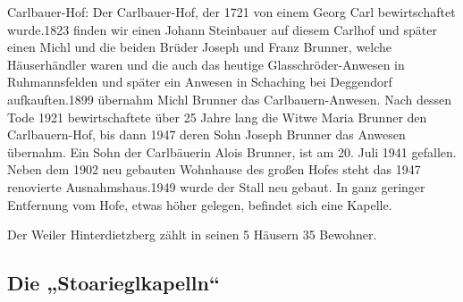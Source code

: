\documentclass[12pt,a4pager]{book}
\begin{document}
Carlbauer-Hof: Der Carlbauer-Hof, der 1721 von einem Georg Carl bewirtschaftet
wurde.1823 finden wir einen Johann Steinbauer auf diesem Carlhof und später
einen Michl und die beiden Brüder Joseph und Franz Brunner, welche Häuserhändler
waren und die auch das heutige Glasschröder-Anwesen in Ruhmannsfelden und später
ein Anwesen in Schaching bei Deggendorf aufkauften.1899 übernahm Michl Brunner
das Carlbauern-Anwesen. Nach dessen Tode 1921 bewirtschaftete über 25 Jahre lang
die Witwe Maria Brunner den Carlbauern-Hof, bis dann 1947 deren Sohn Joseph
Brunner das Anwesen übernahm. Ein Sohn der Carlbäuerin Alois Brunner, ist am 20.
Juli 1941 gefallen. Neben dem 1902 neu gebauten Wohnhause des großen Hofes steht
das 1947 renovierte Ausnahmshaus.1949 wurde der Stall neu gebaut. In ganz
geringer Entfernung vom Hofe, etwas höher gelegen, befindet sich eine Kapelle.

Der Weiler Hinterdietzberg zählt in seinen 5 Häusern 35 Bewohner.

\subsection{Die „Stoarieglkapelln“}
\end{document}
